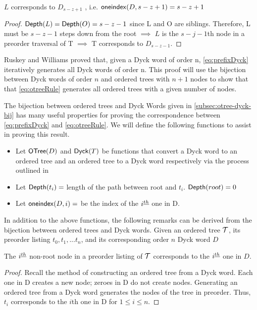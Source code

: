\begin{remark} \label{re:L_sz1}
    $L$ corresponds to $D_{s-z+1}$ , i.e. $\mathsf{oneindex}({D}, s-z+1)=s-z+1$
\end{remark}
\begin{proof}

    $\mathsf{Depth}{(L)}=\mathsf{Depth}{(O)}=s-z-1$ since L and O are siblings. Therefore, L must be $s-z-1$ steps down from the root $\implies$ $L$ is the $s-j-1$th node in a preorder traversal of T $\implies$ T corresponds to $D_{s-z-1}$.


\end{proof}



Ruskey and Williams proved that, given a Dyck word of order n, \ref{eq:prefixDyck} iteratively generates all Dyck words of order n.  This proof will use the bijection between Dyck words of order $n$ and ordered trees with $n+1$ nodes to show that that \ref{eq:otreeRule} generates all ordered trees with a given number of nodes.  



The bijection between ordered trees and Dyck Words given in \ref{subsec:otree-dyck-bij} has many useful properties for proving the correspondence between \ref{eq:prefixDyck} and \ref{eq:otreeRule}.  We will define the following functions to assist in proving this result.


\begin{itemize}
    \item Let $\mathsf{OTree}{(D)}$ and $\mathsf{Dyck}{(T)}$ be functions that convert a Dyck word to an ordered tree and an ordered tree to a Dyck word respectively via the process outlined in 
    \item Let $\mathsf{Depth}{(t_i)}=$ length of the path between root and $t_i$. $\mathsf{Depth}{(root)}=0$
    \item Let $\mathsf{oneindex}({D}, i)=$ be the index of the $i^{\underline{th}}{}$ one in D.
\end{itemize}



In addition to the above functions, 
the following remarks can be derived from the bijection between ordered trees and Dyck words. 
Given an ordered tree $\mathcal{T}$, its preorder listing $t_0,t_1,...t_n$, and its corresponding order $n$ Dyck word $D$
\begin{remark}
    The $i^{\underline{th}}$ non-root node in a preorder listing of $\mathcal{T}$ corresponds to the $i^{\underline{th}}$ one in $D$.

\end{remark}
\begin{proof}
    Recall the method of constructing an ordered tree from a Dyck word.  Each one in D creates a new node; zeroes in D do not create nodes.  Generating an ordered tree from a Dyck word generates the nodes of the tree in preorder.  Thus, $t_i$ corresponds to the $i$th one in D for $1 \le i \le n$.
\end{proof}

